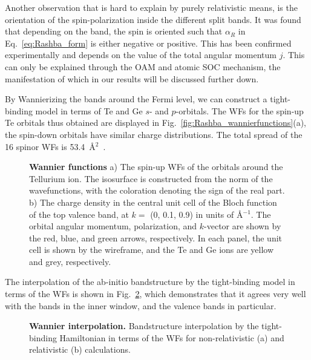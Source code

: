 Another observation that is hard to explain by purely relativistic means, is the orientation of the spin-polarization inside the different split bands.
It was found that depending on the band, the spin is oriented such that $\alpha_R$ in Eq.~\ref{eq:Rashba_form} is either negative or positive. 
This has been confirmed experimentally \cite{Krempasky2015SurfaceSemiconductor} and depends on the value of the total angular momentum $j$.
This can only be explained through the OAM and atomic SOC mechanism, the manifestation of which in our results will be discussed further down.

By Wannierizing the bands around the Fermi level, we can construct a tight-binding model in terms of Te and Ge $s$- and $p$-orbitals.
The WFs for the spin-up Te orbitals thus obtained are displayed in Fig.~\ref{fig:Rashba_wannierfunctions}(a), the spin-down orbitals have similar charge distributions.
The total spread of the 16 spinor WFs is 53.4~\AA$^2$~.
\begin{figure}[h]
\caption{\label{fig:GeTe_wannierization}{\bf Wannier functions} a) The spin-up WFs of the orbitals around the Tellurium ion. The isosurface is constructed from the norm of the wavefunctions, with the coloration denoting the sign of the real part. b) The charge density in the central unit cell of the Bloch function of the top valence band, at $k=$ (0, 0.1, 0.9) in units of \AA$^{-1}$. The orbital angular momentum, polarization, and $k$-vector are shown by the red, blue, and green arrows, respectively. In each panel, the unit cell is shown by the wireframe, and the Te and Ge ions are yellow and grey, respectively.}
\end{figure}

The interpolation of the ab-initio bandstructure by the tight-binding model in terms of the WFs is shown in Fig.~\ref{fig:Rashba_wannierization}, which demonstrates that it agrees very well with the bands in the inner window, and the valence bands in particular. 
\begin{figure}[h]
\caption{\label{fig:Rashba_wannierization}{\bf Wannier interpolation.} Bandstructure interpolation by the tight-binding Hamiltonian in terms of the WFs for non-relativistic (a) and relativistic (b) calculations.}
\end{figure}

